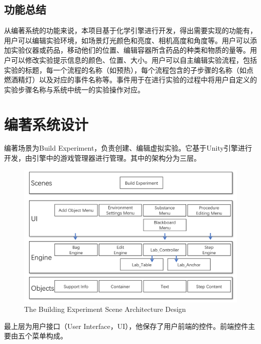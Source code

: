 \subsection{功能总结}
从编著系统的功能来说，本项目基于化学引擎进行开发，得出需要实现的功能有，用户可以编辑实验环境，如场景灯光颜色和亮度、相机高度和角度等。用户可以添加实验仪器或药品，移动他们的位置、编辑容器所含药品的种类和物质的量等。用户可以修改实验提示信息的颜色、位置、大小。用户可以自主编辑实验流程，包括实验的标题，每一个流程的名称（如预热），每个流程包含的子步骤的名称（如点燃酒精灯）以及对应的事件名称等。事件用于在进行实验的过程中将用户自定义的实验步骤名称与系统中统一的实验操作对应。

\section{编著系统设计}
编著场景为Build Experiment，负责创建、编辑虚拟实验。它基于Unity引擎进行开发，由引擎中的游戏管理器进行管理。其中的架构分为三层。

\begin{figure}[!htp]
  \centering
  \includegraphics[width=12cm]{figure/buildearc.png}
    {The Building Experiment Scene Architecture Design}
 \label{fig:gm}
\end{figure}

最上层为用户接口（User Interface，UI），他保存了用户前端的控件。前端控件主要由五个菜单构成。

